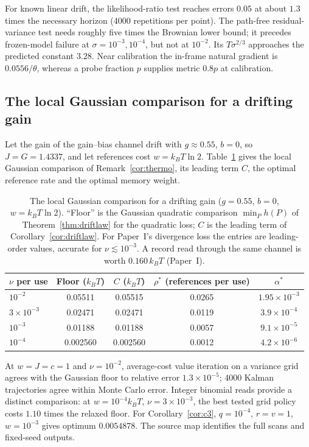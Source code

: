 \documentclass[12pt]{article}
\theoremstyle{definition}
\begin{document}
For known linear drift, the likelihood-ratio test reaches errors $0.05$ at about $1.3$ times the necessary horizon (4000 repetitions per point). The path-free residual-variance test needs roughly five times the Brownian lower bound; it precedes frozen-model failure at $\sigma=10^{-3},10^{-4}$, but not at $10^{-2}$. Its $T\sigma^{2/3}$ approaches the predicted constant $3.28$. Near calibration the in-frame natural gradient is $0.0556/\theta$, whereas a probe fraction $p$ supplies metric $0.8p$ at calibration.

\subsection{The local Gaussian comparison for a drifting gain}
\label{subsec:example_price}

Let the gain of the gain--bias channel drift with $g\approx0.55$, $b=0$, so $J=G=1.4337$, and let references cost $w=k_BT\ln2$. Table~\ref{tab:price} gives the local Gaussian comparison of Remark~\ref{cor:thermo}, its leading term $C$, the optimal reference rate and the optimal memory weight.

\begin{table}[t]
\centering
\small
\begin{tabular}{lcccc}
\toprule
$\nu$ per use & Floor ($k_BT$) & $C$ ($k_BT$) & $\rho^*$ (references per use) & $\alpha^*$\\
\midrule
$10^{-2}$ & 0.05511 & 0.05515 & 0.0265 & $1.95\times10^{-3}$\\
$3\times10^{-3}$ & 0.02471 & 0.02471 & 0.0119 & $3.9\times10^{-4}$\\
$10^{-3}$ & 0.01188 & 0.01188 & 0.0057 & $9.1\times10^{-5}$\\
$10^{-4}$ & 0.002560 & 0.002560 & 0.0012 & $4.2\times10^{-6}$\\
\bottomrule
\end{tabular}
\caption{The local Gaussian comparison for a drifting gain ($g=0.55$, $b=0$, $w=k_BT\ln2$). ``Floor'' is the Gaussian quadratic comparison $\min_Ph(P)$ of Theorem~\ref{thm:driftlaw} for the quadratic loss; $C$ is the leading term of Corollary~\ref{cor:driftlaw}. For Paper~I's divergence loss the entries are leading-order values, accurate for $\nu\lesssim10^{-3}$. A record read through the same channel is worth $0.160\,k_BT$ (Paper~I).}
\label{tab:price}
\end{table}

At $w=J=c=1$ and $\nu=10^{-2}$, average-cost value iteration on a variance grid agrees with the Gaussian floor to relative error $1.3\times10^{-5}$; 4000 Kalman trajectories agree within Monte Carlo error. Integer binomial reads provide a distinct comparison: at $w=10^{-4}k_BT$, $\nu=3\times10^{-3}$, the best tested grid policy costs $1.10$ times the relaxed floor. For Corollary~\ref{cor:c3}, $q=10^{-4}$, $r=v=1$, $w=10^{-3}$ gives optimum $0.0054878$. The source map identifies the full scans and fixed-seed outputs.
\end{document}
